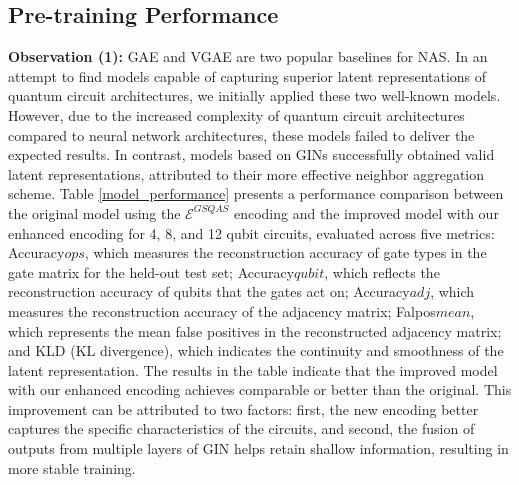 \documentclass{article} %
\begin{document}
\subsection{Pre-training Performance}
\label{pretraning_performance}
\textbf{Observation (1):} GAE and VGAE \citep{kipf2016variational} are two popular baselines for NAS. In an attempt to find models capable of capturing superior latent representations of quantum circuit architectures, we initially applied these two well-known models. However, due to the increased complexity of quantum circuit architectures compared to neural network architectures, these models failed to deliver the expected results. In contrast, models based on GINs \citep{xu2019powerful} successfully obtained valid latent representations, attributed to their more effective neighbor aggregation scheme.
Table \ref{model_performance} presents a performance comparison between the original model using the $\mathcal{E}^{GSQAS}$ encoding and the improved model with our enhanced encoding for 4, 8, and 12 qubit circuits, evaluated across five metrics: Accuracy${ops}$, which measures the reconstruction accuracy of gate types in the gate matrix for the held-out test set; Accuracy${qubit}$, which reflects the reconstruction accuracy of qubits that the gates act on; Accuracy${adj}$, which measures the reconstruction accuracy of the adjacency matrix; Falpos${mean}$, which represents the mean false positives in the reconstructed adjacency matrix; and KLD (KL divergence), which indicates the continuity and smoothness of the latent representation.
The results in the table indicate that the improved model with our enhanced encoding achieves comparable or better than the original. This improvement can be attributed to two factors: first, the new encoding better captures the specific characteristics of the circuits, and second, the fusion of outputs from multiple layers of GIN helps retain shallow information, resulting in more stable training.
\end{document}
